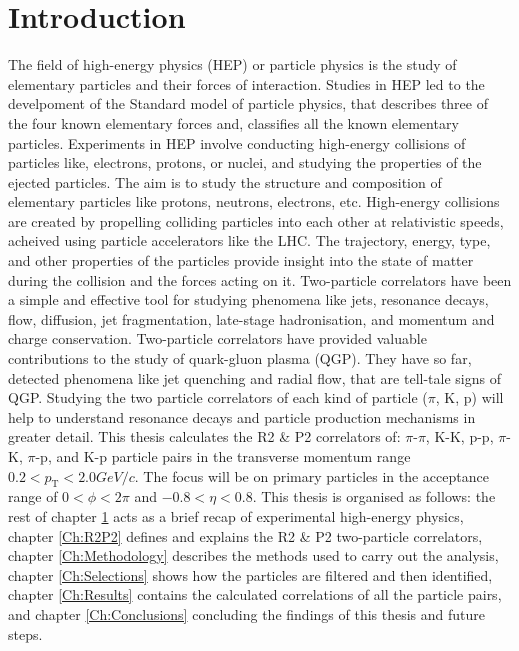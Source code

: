 \documentclass[12pt,a4paper,twoside]{report}
\begin{document}
\chapter{Introduction}\label{Ch:Introduction}
The field of high-energy physics (HEP) or particle physics is the study of elementary particles and their forces of interaction. Studies in HEP led to the develpoment of the Standard model of particle physics, that describes three of the four known elementary forces and, classifies all the known elementary particles. Experiments in HEP involve conducting high-energy collisions of particles like, electrons, protons, or nuclei, and studying the properties of the ejected particles. The aim is to study the structure and composition of elementary particles like protons, neutrons, electrons, etc. High-energy collisions are created by propelling colliding particles into each other at relativistic speeds, acheived using particle accelerators like the LHC. The trajectory, energy, type, and other properties of the particles provide insight into the state of matter during the collision and the forces acting on it. Two-particle correlators have been a simple and effective tool for studying phenomena like jets, resonance decays, flow, diffusion, jet fragmentation, late-stage hadronisation, and momentum and charge conservation. Two-particle correlators have provided valuable contributions to the study of quark-gluon plasma (QGP). They have so far, detected phenomena like jet quenching and radial flow, that are tell-tale signs of QGP. Studying the two particle correlators of each kind of particle ($\pi$, K, p) will help to understand resonance decays and particle production mechanisms in greater detail. This thesis calculates the R2 \& P2 correlators of: $\pi$-$\pi$, K-K, p-p, $\pi$-K, $\pi$-p, and K-p particle pairs in the transverse momentum range $0.2<p_\mathrm{T}<2.0 GeV/c$. The focus will be on primary particles in the acceptance range of $0<\phi<2\pi$ and $-0.8<\eta<0.8$. This thesis is organised as follows: the rest of chapter \ref{Ch:Introduction} acts as a brief recap of experimental high-energy physics, chapter \ref{Ch:R2P2} defines and explains the R2 \& P2 two-particle correlators, chapter \ref{Ch:Methodology} describes the methods used to carry out the analysis, chapter \ref{Ch:Selections} shows how the particles are filtered and then identified, chapter \ref{Ch:Results} contains the calculated correlations of all the particle pairs, and chapter \ref{Ch:Conclusions} concluding the findings of this thesis and future steps.
\newpage
\end{document}
